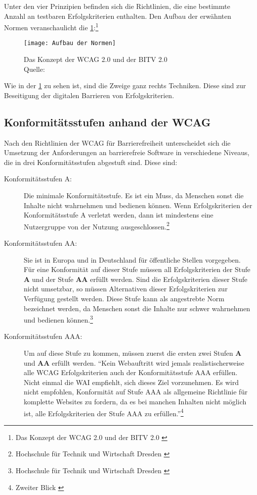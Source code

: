 Unter den vier Prinzipien befinden sich die Richtlinien, die eine bestimmte Anzahl an testbaren Erfolgskriterien enthalten. Den Aufbau der erwähnten Normen veranschaulicht die \cref{fig:Aufbau der Normen}:\footnote{Das Konzept der \ac{WCAG} 2.0 und der \ac{BITV} 2.0 \cite{AufbauDerNormen}}

\begin{figure}[H]
	\centering
	\texttt{[image: Aufbau der Normen]}
	\caption[Das Konzept der \ac{WCAG} 2.0 und der \ac{BITV} 2.0]{Das Konzept der \ac{WCAG} 2.0 und der \ac{BITV} 2.0 \\Quelle: \cite{AufbauDerNormen}}
	\label{fig:Aufbau der Normen}
\end{figure}

Wie in der \cref{fig:Aufbau der Normen} zu sehen ist, sind die Zweige ganz rechts Techniken. Diese sind zur Beseitigung der digitalen Barrieren von Erfolgskriterien.

\subsection{Konformitätsstufen anhand der \ac{WCAG}}
\label{subsubsec: Konformitätsstufen}
Nach den Richtlinien der \ac{WCAG} für Barrierefreiheit unterscheidet sich die Umsetzung der Anforderungen an barrierefreie Software in verschiedene Niveaus, die in drei Konformitätsstufen abgestuft sind. Diese sind:

\begin{description}
	\item [Konformitätsstufen A:] Die minimale Konformitätsstufe. Es ist ein Muss, da Menschen sonst die Inhalte nicht wahrnehmen und bedienen können. Wenn
	Erfolgskriterien der Konformitätsstufe A verletzt werden, dann ist mindestens eine Nutzergruppe von der Nutzung 
	ausgeschlossen.\footnote{Hochschule für Technik und Wirtschaft Dresden \cite{HV}}
	
	\item [Konformitätsstufen AA:] Sie ist in Europa und in Deutschland für öffentliche Stellen vorgegeben. Für eine Konformität auf dieser Stufe 
	müssen all Erfolgskriterien der Stufe \textbf{A} und der Stufe \textbf{AA} erfüllt werden. Sind die Erfolgskriterien dieser Stufe nicht umsetzbar, so
	müssen Alternativen dieser Erfolgskriterien
	zur Verfügung gestellt werden. Diese Stufe kann als angestrebte Norm bezeichnet werden, da Menschen sonst die Inhalte nur schwer wahrnehmen und bedienen 
	können.\footnote{Hochschule für Technik und Wirtschaft Dresden \cite{HV}}
	
	\item [Konformitätsstufen AAA:] Um auf diese Stufe zu kommen, müssen zuerst die ersten zwei Stufen \textbf{A} und \textbf{AA} erfüllt werden. "`Kein 
	Webauftritt wird jemals realistischerweise alle WCAG Erfolgskriterien auch der Konformitätsstufe AAA erfüllen. Nicht einmal die WAI empfiehlt, sich 
	dieses Ziel vorzunehmen. Es wird nicht empfohlen, Konformität auf Stufe AAA als allgemeine Richtlinie für komplette Websites zu fordern, da es bei manchen
	Inhalten nicht möglich ist, alle Erfolgskriterien der Stufe AAA zu erfüllen."'\footnote{Zweiter Blick \cite{ZweiterBlick}}
\end{description}

